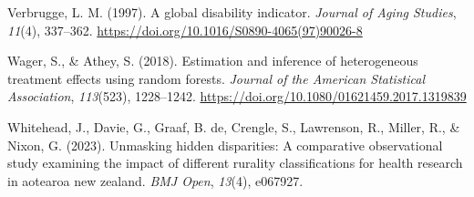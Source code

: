 \documentclass[
  single column]{article}
\newlength{\cslhangindent}
\newenvironment{CSLReferences}[2] %
 {\begin{list}{}{%
  \setlength{\itemindent}{0pt}
  \setlength{\leftmargin}{0pt}
  \setlength{\parsep}{0pt}
  \ifodd #1
   \setlength{\leftmargin}{\cslhangindent}
   \setlength{\itemindent}{-1\cslhangindent}
  \fi
  \setlength{\itemsep}{#2\baselineskip}}}
 {\end{list}}
\begin{document}
\begin{CSLReferences}{1}{0}
Verbrugge, L. M. (1997). A global disability indicator. \emph{Journal of
Aging Studies}, \emph{11}(4), 337--362.
\url{https://doi.org/10.1016/S0890-4065(97)90026-8}

Wager, S., \& Athey, S. (2018). Estimation and inference of
heterogeneous treatment effects using random forests. \emph{Journal of
the American Statistical Association}, \emph{113}(523), 1228--1242.
\url{https://doi.org/10.1080/01621459.2017.1319839}

Whitehead, J., Davie, G., Graaf, B. de, Crengle, S., Lawrenson, R.,
Miller, R., \& Nixon, G. (2023). Unmasking hidden disparities: A
comparative observational study examining the impact of different
rurality classifications for health research in aotearoa new zealand.
\emph{BMJ Open}, \emph{13}(4), e067927.

\end{CSLReferences}
\end{document}
